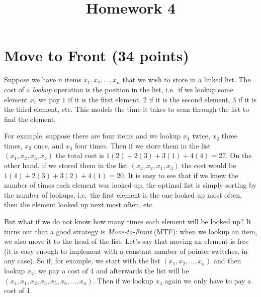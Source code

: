 \documentclass{article}
\begin{document}
\title{Homework 4}
\maketitle
\thispagestyle{fancy}

\section{Move to Front (34 points)}

Suppose we have $n$ items $x_1, x_2, \dots, x_n$ that we wish to store in a linked list.  The cost of a \emph{lookup} operation is the position in the list, i.e.~if we lookup some element $x_i$ we pay $1$ if it is the first element, $2$ if it is the second element, $3$ if it is the third element, etc.  This models the time it takes to scan through the list to find the element.  

For example, suppose there are four items and we lookup $x_1$ twice, $x_2$ three times, $x_3$ once, and $x_4$ four times.  Then if we store them in the list $(x_1, x_2, x_3, x_4)$ the total cost is $1(2) + 2(3) + 3(1) + 4(4) = 27$.  On the other hand, if we stored them in the list $(x_4, x_2, x_1, x_3)$ the cost would be $1(4) + 2(3) + 3(2) + 4(1) = 20$.  It is easy to see that if we knew the number of times each element was looked up, the optimal list is simply sorting by the number of lookups, i.e.~the first element is the one looked up most often, then the element looked up next most often, etc.  

But what if we do not know how many times each element will be looked up?  It turns out that a good strategy is \emph{Move-to-Front} (MTF): when we lookup an item, we also move it to the head of the list.  Let's say that moving an element is free (it is easy enough to implement with a constant number of pointer switches, in any case).  So if, for example, we start with the list $(x_1, x_2, \dots, x_n)$ and then lookup $x_4$, we pay a cost of $4$ and afterwards the list will be $(x_4, x_1, x_2, x_3, x_5, x_6, \dots, x_n)$.  Then if we lookup $x_4$ again we only have to pay a cost of $1$.  
\end{document}
